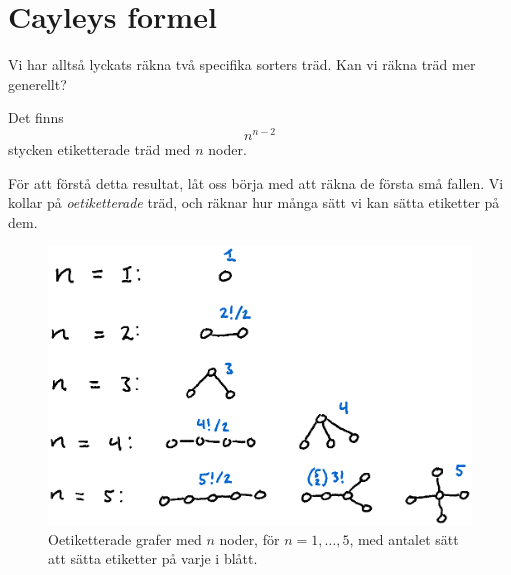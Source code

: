 \documentclass[nobib]{tufte-handout}
\begin{document}
\section{Cayleys formel}

Vi har alltså lyckats räkna två specifika sorters träd. Kan vi räkna träd mer generellt?

\begin{theorem}
    Det finns
    $$n^{n-2}$$
    stycken etiketterade träd med $n$ noder.
\end{theorem}

För att förstå detta resultat, låt oss börja med att räkna de första små fallen. Vi kollar på \emph{oetiketterade} träd, och räknar hur många sätt vi kan sätta etiketter på dem.

\begin{figure}
    \centering
    \includegraphics[width = \textwidth]{graphics/counting_tree_labellings.png}
    \caption{Oetiketterade grafer med $n$ noder, för $n = 1,\ldots,5$, med antalet sätt att sätta etiketter på varje i blått.}
\end{figure}
\end{document}
